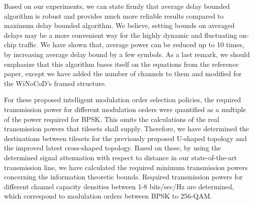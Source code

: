 Based on our experiments, we can state firmly that average delay bounded algorithm is robust and provides much more reliable results compared to maximum delay bounded algorithm. We believe, setting bounds on averaged delays may be a more convenient way for the highly dynamic and fluctuating on-chip traffic. We have shown that, average power can be reduced up to 10 times, by increasing average delay bound by a few symbols. As a last remark, we should emphasize that this algorithm bases itself on the equations from the reference paper, except we have added the number of channels to them and modified for the WiNoCoD's framed structure.   

For these proposed intelligent modulation order selection policies, the required transmission power for different modulation orders were quantified as a multiple of the power required for BPSK. This omits the calculations of the real transmission powers that tilesets shall supply. Therefore, we have determined the destinations between tilesets for the previously proposed U-shaped topology and the improved latest cross-shaped topology. Based on these, by using the determined signal attenuation with respect to distance in our state-of-the-art transmission line, we have calculated the required minimum transmission powers concerning the information theoretic bounds. Required transmission powers for different channel capacity densities between 1-8 bits/sec/Hz are determined, which correspond to modulation orders between BPSK to 256-QAM. 


